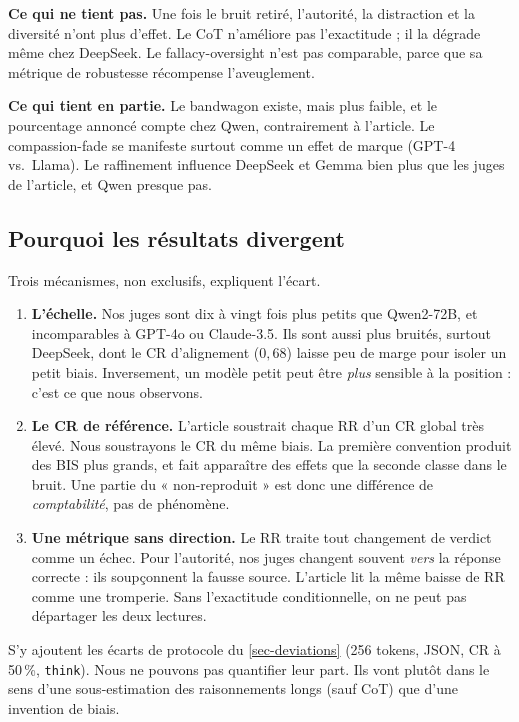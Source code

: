 \textbf{Ce qui ne tient pas.} Une fois le bruit retiré, l'autorité, la distraction et la diversité n'ont plus d'effet. Le CoT n'améliore pas l'exactitude ; il la dégrade même chez DeepSeek. Le fallacy-oversight n'est pas comparable, parce que sa métrique de robustesse récompense l'aveuglement.

\textbf{Ce qui tient en partie.} Le bandwagon existe, mais plus faible, et le pourcentage annoncé compte chez Qwen, contrairement à l'article. Le compassion-fade se manifeste surtout comme un effet de marque (GPT-4 vs.\ Llama). Le raffinement influence DeepSeek et Gemma bien plus que les juges de l'article, et Qwen presque pas.

\subsection{Pourquoi les résultats divergent}

Trois mécanismes, non exclusifs, expliquent l'écart.

\begin{enumerate}[leftmargin=1.6em]
  \item \textbf{L'échelle.} Nos juges sont dix à vingt fois plus petits que Qwen2-72B, et incomparables à GPT-4o ou Claude-3.5. Ils sont aussi plus bruités, surtout DeepSeek, dont le CR d'alignement ($0{,}68$) laisse peu de marge pour isoler un petit biais. Inversement, un modèle petit peut être \emph{plus} sensible à la position : c'est ce que nous observons.
  \item \textbf{Le CR de référence.} L'article soustrait chaque RR d'un CR global très élevé. Nous soustrayons le CR du même biais. La première convention produit des BIS plus grands, et fait apparaître des effets que la seconde classe dans le bruit. Une partie du « non-reproduit » est donc une différence de \emph{comptabilité}, pas de phénomène.
  \item \textbf{Une métrique sans direction.} Le RR traite tout changement de verdict comme un échec. Pour l'autorité, nos juges changent souvent \emph{vers} la réponse correcte : ils soupçonnent la fausse source. L'article lit la même baisse de RR comme une tromperie. Sans l'exactitude conditionnelle, on ne peut pas départager les deux lectures.
\end{enumerate}

S'y ajoutent les écarts de protocole du \cref{sec-deviations} (256 tokens, JSON, CR à 50\,\%, \texttt{think}). Nous ne pouvons pas quantifier leur part. Ils vont plutôt dans le sens d'une sous-estimation des raisonnements longs (sauf CoT) que d'une invention de biais.

